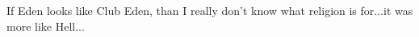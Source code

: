 \begin{post}
	\begin{content}
\begin{blockquote}If Eden looks like Club Eden, than I really don't know what religion is for...it was more like Hell...\end{blockquote}
	\end{content}
\end{post}

